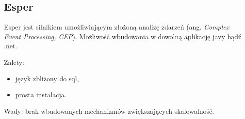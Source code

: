 \subsection{Esper}
Esper jest silnikiem umożliwiającym złożoną analizę zdarzeń (ang. \textit{Complex Event Processing, CEP}).
Możliwość wbudowania w dowolną aplikację javy bądź .net.

Zalety:
\begin{itemize}
  \item język zbliżony do sql,
  \item prosta instalacja.
\end{itemize}

Wady:
brak wbudowanych mechanizmów zwiększających skalowalność.

